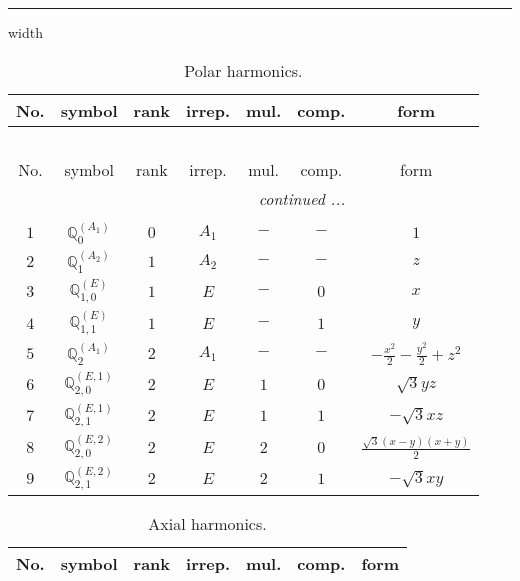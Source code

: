 \documentclass[fleqn,10pt,landscape]{article}
\begin{document}
\begin{itemize}
 \hfil \hrule height 1mm width \textwidth \hfil

\begin{center}
\renewcommand{\arraystretch}{1.3}
\begin{longtable}{ccccccc}
\caption{Polar harmonics.}
 \\
 \hline \hline
No. & symbol & rank & irrep. & mul. & comp. & form \\ \hline \endfirsthead

\multicolumn{6}{l}{\tablename\ \thetable{}} \\
 \hline \hline
No. & symbol & rank & irrep. & mul. & comp. & form \\ \hline \endhead

 \hline \hline
\multicolumn{6}{r}{\footnotesize\it continued ...} \\ \endfoot

 \hline \hline
\multicolumn{6}{r}{} \\ \endlastfoot

$ 1 $ & $ \mathbb{Q}_{0}^{(A_{1})} $ & $ 0 $ & $ A_{1} $ & $ - $ & $ - $ & $ 1 $ \\ \hline
$ 2 $ & $ \mathbb{Q}_{1}^{(A_{2})} $ & $ 1 $ & $ A_{2} $ & $ - $ & $ - $ & $ z $ \\
$ 3 $ & $ \mathbb{Q}_{1,0}^{(E)} $ & $ 1 $ & $ E $ & $ - $ & $ 0 $ & $ x $ \\
$ 4 $ & $ \mathbb{Q}_{1,1}^{(E)} $ & $ 1 $ & $ E $ & $ - $ & $ 1 $ & $ y $ \\ \hline
$ 5 $ & $ \mathbb{Q}_{2}^{(A_{1})} $ & $ 2 $ & $ A_{1} $ & $ - $ & $ - $ & $ - \frac{x^{2}}{2} - \frac{y^{2}}{2} + z^{2} $ \\
$ 6 $ & $ \mathbb{Q}_{2,0}^{(E,1)} $ & $ 2 $ & $ E $ & $ 1 $ & $ 0 $ & $ \sqrt{3} y z $ \\
$ 7 $ & $ \mathbb{Q}_{2,1}^{(E,1)} $ & $ 2 $ & $ E $ & $ 1 $ & $ 1 $ & $ - \sqrt{3} x z $ \\
$ 8 $ & $ \mathbb{Q}_{2,0}^{(E,2)} $ & $ 2 $ & $ E $ & $ 2 $ & $ 0 $ & $ \frac{\sqrt{3} \left(x - y\right) \left(x + y\right)}{2} $ \\
$ 9 $ & $ \mathbb{Q}_{2,1}^{(E,2)} $ & $ 2 $ & $ E $ & $ 2 $ & $ 1 $ & $ - \sqrt{3} x y $ \\
\end{longtable}
\end{center}
\begin{center}
\renewcommand{\arraystretch}{1.3}
\begin{longtable}{ccccccc}
\caption{Axial harmonics.}
 \\
 \hline \hline
No. & symbol & rank & irrep. & mul. & comp. & form \\ \hline \endfirsthead


\end{longtable}
\end{center}
\end{itemize}
\end{document}
